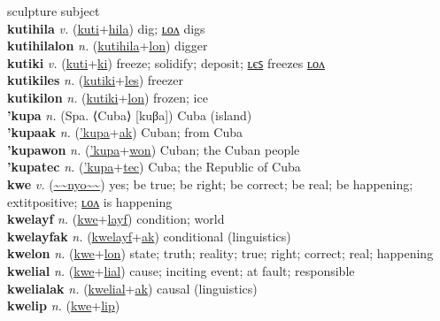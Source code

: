 sculpture subject \label{kutimwonilum} \\
\textbf{kutihila} \textit{v.} (\hyperref[kuti]{kuti}+\hyperref[hila]{hila})
dig; \hyperref[kutihilalon]{ʟᴏᴧ} digs \label{kutihila} \\
\textbf{kutihilalon} \textit{n.} (\hyperref[kutihila]{kutihila}+\hyperref[lon]{lon})
digger \label{kutihilalon} \\
\textbf{kutiki} \textit{v.} (\hyperref[kuti]{kuti}+\hyperref[ki]{ki})
freeze; solidify; deposit; \hyperref[kutikiles]{ʟєꜱ} freezes \hyperref[kutikilon]{ʟᴏᴧ} \label{kutiki} \\
\textbf{kutikiles} \textit{n.} (\hyperref[kutiki]{kutiki}+\hyperref[les]{les})
freezer \label{kutikiles} \\
\textbf{kutikilon} \textit{n.} (\hyperref[kutiki]{kutiki}+\hyperref[lon]{lon})
frozen; ice \label{kutikilon} \\
\textbf{'kupa} \textit{n.} (Spa. ⟨Cuba⟩ [kuβa])
Cuba (island) \label{'kupa} \\
\textbf{'kupaak} \textit{n.} (\hyperref['kupa]{'kupa}+\hyperref[ak]{ak})
Cuban; from Cuba \label{'kupaak} \\
\textbf{'kupawon} \textit{n.} (\hyperref['kupa]{'kupa}+\hyperref[won]{won})
Cuban; the Cuban people \label{'kupawon} \\
\textbf{'kupatec} \textit{n.} (\hyperref['kupa]{'kupa}+\hyperref[tec]{tec})
Cuba; the Republic of Cuba \label{'kupatec} \\
\textbf{kwe} \textit{v.} (\hyperref[nyo]{\~{}\~{}nyo\~{}\~{}})
yes; be true; be right; be correct; be real; be happening; 	extit{positive}; \hyperref[kwelon]{ʟᴏᴧ} is happening \label{kwe} \\
\textbf{kwelayf} \textit{n.} (\hyperref[kwe]{kwe}+\hyperref[layf]{layf})
condition; world \label{kwelayf} \\
\textbf{kwelayfak} \textit{n.} (\hyperref[kwelayf]{kwelayf}+\hyperref[ak]{ak})
conditional (linguistics) \label{kwelayfak} \\
\textbf{kwelon} \textit{n.} (\hyperref[kwe]{kwe}+\hyperref[lon]{lon})
state; truth; reality; true; right; correct; real; happening \label{kwelon} \\
\textbf{kwelial} \textit{n.} (\hyperref[kwe]{kwe}+\hyperref[lial]{lial})
cause; inciting event; at fault; responsible \label{kwelial} \\
\textbf{kwelialak} \textit{n.} (\hyperref[kwelial]{kwelial}+\hyperref[ak]{ak})
causal (linguistics) \label{kwelialak} \\
\textbf{kwelip} \textit{n.} (\hyperref[kwe]{kwe}+\hyperref[lip]{lip})
